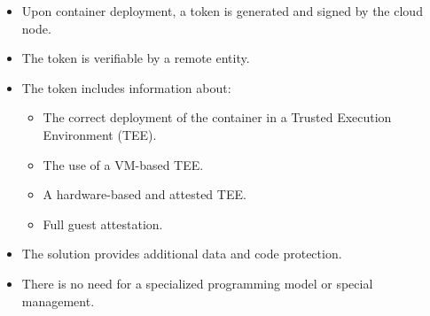 \begin{itemize}
    \item Upon container deployment, a token is generated and signed
      by the cloud node.
    \item The token is verifiable by a remote entity.
    \item The token includes information about:
    \begin{itemize}
        \item The correct deployment of the container in a Trusted
          Execution Environment (TEE).
        \item The use of a VM-based TEE.
        \item A hardware-based and attested TEE.
        \item Full guest attestation.
    \end{itemize}
    \item The solution provides additional data and code protection.
    \item There is no need for a specialized programming model or
      special management.
\end{itemize}

